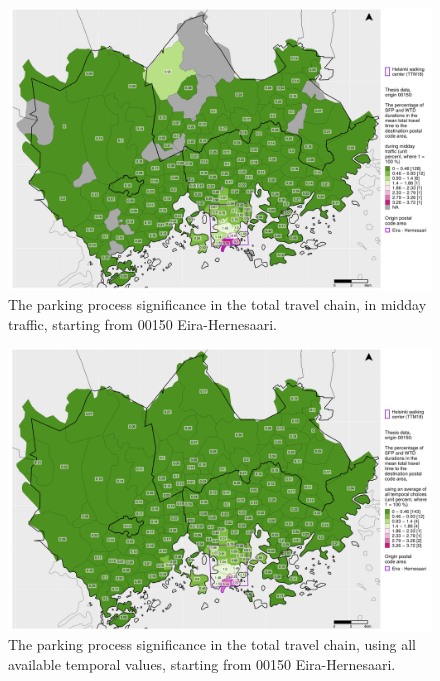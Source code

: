 \begin{figure}[H]%
    \centering
    \includegraphics[trim={0.9cm 0.3cm 0.25cm 0.3cm},clip,width=\textwidth]{images/compare_traveltimes_mapfill-msc_m_pct_fromzip-00150_28-09-2020.png}
    \caption[Parking process significance from Eira-Hernesaari, midday traffic]{The parking process significance in the total travel chain, in midday traffic, starting from 00150 Eira-Hernesaari.}%
    \label{fig:compare_msc_m_pct_00150}%
\end{figure}

\begin{figure}[H]%
    \centering
    \includegraphics[trim={0.9cm 0.3cm 0.25cm 0.3cm},clip,width=\textwidth]{images/compare_traveltimes_mapfill-msc_all_pct_fromzip-00150_28-09-2020.png}
    \caption[Parking process significance from Eira-Hernesaari, all temporal values]{The parking process significance in the total travel chain, using all available temporal values, starting from 00150 Eira-Hernesaari.}%
    \label{fig:compare_msc_all_pct_00150}%
\end{figure}

